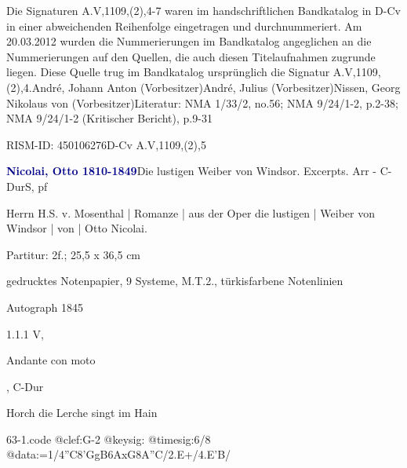 \documentclass[a4paper, twocolumn, 11pt]{book}
\begin{document}
\newline %
\par Die Signaturen A.V,1109,(2),4-7 waren im handschriftlichen Bandkatalog in D-Cv in einer abweichenden Reihenfolge eingetragen und durchnummeriert. Am 20.03.2012 wurden die Nummerierungen im Bandkatalog angeglichen an die Nummerierungen auf den Quellen, die auch diesen Titelaufnahmen zugrunde liegen. Diese Quelle trug im Bandkatalog ursprünglich die Signatur A.V,1109,(2),4.\newline André, Johann Anton  (Vorbesitzer)\newline André, Julius  (Vorbesitzer)\newline Nissen, Georg Nikolaus von  (Vorbesitzer)\newline Literatur: NMA  1/33/2, no.56; NMA  9/24/1-2, p.2-38; NMA  9/24/1-2 (Kritischer Bericht), p.9-31
\par RISM-ID: 450106276\newline D-Cv  A.V,1109,(2),5
\par \vspace{16pt} \textcolor{darkblue}{\textbf{Nicolai, Otto  1810-1849}}\hfillplus{[63]}\newline Die lustigen Weiber von Windsor. Excerpts. Arr - C-Dur\newline S, pf
\par \begin{itshape} Herrn H.S. v. Mosenthal | Romanze | aus der Oper {\textquotedbl}die lustigen | Weiber von Windsor{\textquotedbl} | von | Otto Nicolai.\end{itshape} 
\par \textcolor{darkblue}{}  Partitur: 2f.; 25,5 x 36,5 cm\newline \begin{small} gedrucktes Notenpapier,  9 Systeme, {\textquotedbl}M.T.2.{\textquotedbl}, türkisfarbene Notenlinien\end{small} \newline Autograph  1845
\par 1.1.1  V, \begin{itshape}Andante con moto\end{itshape}, C-Dur\newline \begin{footnotesize} Horch die Lerche singt im Hain \end{footnotesize}  
\begin{filecontents*}{63-1.code}
@clef:G-2
@keysig:
@timesig:6/8
@data:=1/4''C8'GgB6AxG8A''C/2.E+/4.E'B/
\end{filecontents*}
\end{document}
